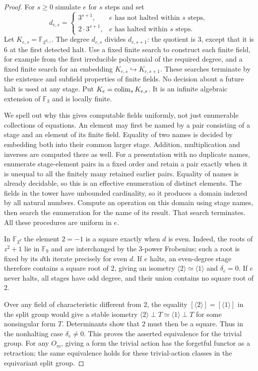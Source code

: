 \begin{proof}
For $s\geq0$ simulate $e$ for $s$ steps and set
\[
 d_{e,s}=
 \begin{cases}
  3^{s+1},&e\text{ has not halted within }s\text{ steps},\\
  2\cdot3^{s+1},&e\text{ has halted within }s\text{ steps}.
 \end{cases}                                             \tag{C.3.L4}
\]
Let $K_{e,s}=\mathbb F_{3^{d_{e,s}}}$.
The degree $d_{e,s}$ divides $d_{e,s+1}$: the quotient is $3$,
except that it is $6$ at the first detected halt.
Use a fixed finite search to construct each finite field, for
example from the first irreducible polynomial of the required
degree, and a fixed finite search for an embedding
$K_{e,s}\hookrightarrow K_{e,s+1}$. These searches terminate
by the existence and subfield properties of finite fields.
No decision about a future halt is used at any stage.
Put $K_e=\mathop{\rm colim}_sK_{e,s}$.
It is an infinite algebraic extension of $\mathbb F_3$ and is
locally finite.

We spell out why this gives computable fields uniformly, not
just enumerable collections of equations. An element may first
be named by a pair consisting of a stage and an element of its
finite field. Equality of two names is decided by embedding
both into their common larger stage. Addition, multiplication
and inverses are computed there as well. For a presentation
with no duplicate names, enumerate stage-element pairs in a
fixed order and retain a pair exactly when it is unequal to
all the finitely many retained earlier pairs. Equality of
names is already decidable, so this is an effective enumeration
of distinct elements. The fields in the tower have unbounded
cardinality, so it produces a domain indexed by all natural
numbers. Compute an operation on this domain using stage
names, then search the enumeration for the name of its result.
That search terminates. All these procedures are uniform in $e$.

In $\mathbb F_{3^d}$ the element $2=-1$ is a square exactly
when $d$ is even. Indeed, the roots of $z^2+1$ lie in
$\mathbb F_9$ and are interchanged by the $3$-power Frobenius;
such a root is fixed by its $d$th iterate precisely for even
$d$. If $e$ halts, an even-degree stage therefore contains a
square root of $2$, giving an isometry
$\langle2\rangle\simeq\langle1\rangle$ and $\delta_e=0$.
If $e$ never halts, all stages have odd degree, and their union
contains no square root of $2$.

Over any field of characteristic different from $2$, the
equality $[\langle2\rangle]=[\langle1\rangle]$ in the split
group would give a stable isometry
$\langle2\rangle\perp T\simeq\langle1\rangle\perp T$ for some
nonsingular form $T$. Determinants show that $2$ must then be a
square. Thus in the nonhalting case $\delta_e\ne0$.
This proves the asserted equivalence for the trivial group.
For any $O_m$, giving a form the trivial action has the
forgetful functor as a retraction; the same equivalence holds
for these trivial-action classes in the equivariant split group.


\end{proof}
